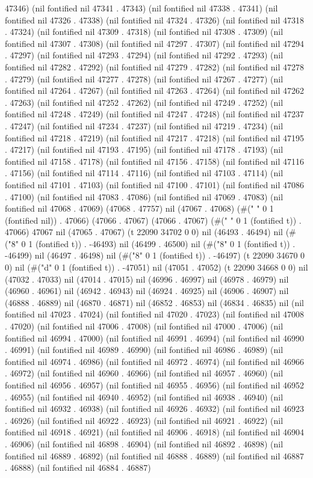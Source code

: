 47346) (nil fontified nil 47341 . 47343) (nil fontified nil 47338 . 47341) (nil fontified nil 47326 . 47338) (nil fontified nil 47324 . 47326) (nil fontified nil 47318 . 47324) (nil fontified nil 47309 . 47318) (nil fontified nil 47308 . 47309) (nil fontified nil 47307 . 47308) (nil fontified nil 47297 . 47307) (nil fontified nil 47294 . 47297) (nil fontified nil 47293 . 47294) (nil fontified nil 47292 . 47293) (nil fontified nil 47282 . 47292) (nil fontified nil 47279 . 47282) (nil fontified nil 47278 . 47279) (nil fontified nil 47277 . 47278) (nil fontified nil 47267 . 47277) (nil fontified nil 47264 . 47267) (nil fontified nil 47263 . 47264) (nil fontified nil 47262 . 47263) (nil fontified nil 47252 . 47262) (nil fontified nil 47249 . 47252) (nil fontified nil 47248 . 47249) (nil fontified nil 47247 . 47248) (nil fontified nil 47237 . 47247) (nil fontified nil 47234 . 47237) (nil fontified nil 47219 . 47234) (nil fontified nil 47218 . 47219) (nil fontified nil 47217 . 47218) (nil fontified nil 47195 . 47217) (nil fontified nil 47193 . 47195) (nil fontified nil 47178 . 47193) (nil fontified nil 47158 . 47178) (nil fontified nil 47156 . 47158) (nil fontified nil 47116 . 47156) (nil fontified nil 47114 . 47116) (nil fontified nil 47103 . 47114) (nil fontified nil 47101 . 47103) (nil fontified nil 47100 . 47101) (nil fontified nil 47086 . 47100) (nil fontified nil 47083 . 47086) (nil fontified nil 47069 . 47083) (nil fontified nil 47068 . 47069) (47068 . 47757) nil (47067 . 47068) (#(" " 0 1 (fontified nil)) . 47066) (47066 . 47067) (47066 . 47067) (#(" " 0 1 (fontified t)) . 47066) 47067 nil (47065 . 47067) (t 22090 34702 0 0) nil (46493 . 46494) nil (#("8" 0 1 (fontified t)) . -46493) nil (46499 . 46500) nil (#("8" 0 1 (fontified t)) . -46499) nil (46497 . 46498) nil (#("8" 0 1 (fontified t)) . -46497) (t 22090 34670 0 0) nil (#("d" 0 1 (fontified t)) . -47051) nil (47051 . 47052) (t 22090 34668 0 0) nil (47032 . 47033) nil (47014 . 47015) nil (46996 . 46997) nil (46978 . 46979) nil (46960 . 46961) nil (46942 . 46943) nil (46924 . 46925) nil (46906 . 46907) nil (46888 . 46889) nil (46870 . 46871) nil (46852 . 46853) nil (46834 . 46835) nil (nil fontified nil 47023 . 47024) (nil fontified nil 47020 . 47023) (nil fontified nil 47008 . 47020) (nil fontified nil 47006 . 47008) (nil fontified nil 47000 . 47006) (nil fontified nil 46994 . 47000) (nil fontified nil 46991 . 46994) (nil fontified nil 46990 . 46991) (nil fontified nil 46989 . 46990) (nil fontified nil 46986 . 46989) (nil fontified nil 46974 . 46986) (nil fontified nil 46972 . 46974) (nil fontified nil 46966 . 46972) (nil fontified nil 46960 . 46966) (nil fontified nil 46957 . 46960) (nil fontified nil 46956 . 46957) (nil fontified nil 46955 . 46956) (nil fontified nil 46952 . 46955) (nil fontified nil 46940 . 46952) (nil fontified nil 46938 . 46940) (nil fontified nil 46932 . 46938) (nil fontified nil 46926 . 46932) (nil fontified nil 46923 . 46926) (nil fontified nil 46922 . 46923) (nil fontified nil 46921 . 46922) (nil fontified nil 46918 . 46921) (nil fontified nil 46906 . 46918) (nil fontified nil 46904 . 46906) (nil fontified nil 46898 . 46904) (nil fontified nil 46892 . 46898) (nil fontified nil 46889 . 46892) (nil fontified nil 46888 . 46889) (nil fontified nil 46887 . 46888) (nil fontified nil 46884 . 46887) 